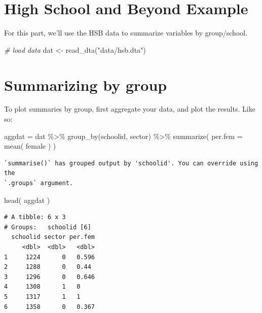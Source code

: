 \documentclass[
  letterpaper,
  DIV=11,
  numbers=noendperiod]{scrreprt}
\newenvironment{Shaded}{\begin{snugshade}}{\end{snugshade}}
\newcommand{\AttributeTok}[1]{\textcolor[rgb]{0.49,0.56,0.16}{#1}}
\newcommand{\CommentTok}[1]{\textcolor[rgb]{0.38,0.63,0.69}{\textit{#1}}}
\newcommand{\FunctionTok}[1]{\textcolor[rgb]{0.02,0.16,0.49}{#1}}
\newcommand{\NormalTok}[1]{\textcolor[rgb]{0.00,0.44,0.13}{#1}}
\newcommand{\OtherTok}[1]{\textcolor[rgb]{0.00,0.44,0.13}{#1}}
\newcommand{\SpecialCharTok}[1]{\textcolor[rgb]{0.25,0.44,0.63}{#1}}
\newcommand{\StringTok}[1]{\textcolor[rgb]{0.25,0.44,0.63}{#1}}
\begin{document}
\hypertarget{high-school-and-beyond-example}{%
\section{High School and Beyond
Example}\label{high-school-and-beyond-example}}

For this part, we'll use the HSB data to summarize variables by
group/school.

\begin{Shaded}
\begin{Highlighting}[]
\CommentTok{\# load data }
\NormalTok{dat }\OtherTok{\textless{}{-}} \FunctionTok{read\_dta}\NormalTok{(}\StringTok{"data/hsb.dta"}\NormalTok{)}
\end{Highlighting}
\end{Shaded}

\hypertarget{summarizing-by-group}{%
\section{Summarizing by group}\label{summarizing-by-group}}

To plot summaries by group, first aggregate your data, and plot the
results. Like so:

\begin{Shaded}
\begin{Highlighting}[]
\NormalTok{aggdat }\OtherTok{=}\NormalTok{ dat }\SpecialCharTok{\%\textgreater{}\%} 
  \FunctionTok{group\_by}\NormalTok{(schoolid, sector) }\SpecialCharTok{\%\textgreater{}\%}
  \FunctionTok{summarize}\NormalTok{( }\AttributeTok{per.fem =} \FunctionTok{mean}\NormalTok{( female ) )}
\end{Highlighting}
\end{Shaded}

\begin{verbatim}
`summarise()` has grouped output by 'schoolid'. You can override using the
`.groups` argument.
\end{verbatim}

\begin{Shaded}
\begin{Highlighting}[]
\FunctionTok{head}\NormalTok{( aggdat )}
\end{Highlighting}
\end{Shaded}

\begin{verbatim}
# A tibble: 6 x 3
# Groups:   schoolid [6]
  schoolid sector per.fem
     <dbl>  <dbl>   <dbl>
1     1224      0   0.596
2     1288      0   0.44 
3     1296      0   0.646
4     1308      1   0    
5     1317      1   1    
6     1358      0   0.367
\end{verbatim}
\end{document}
